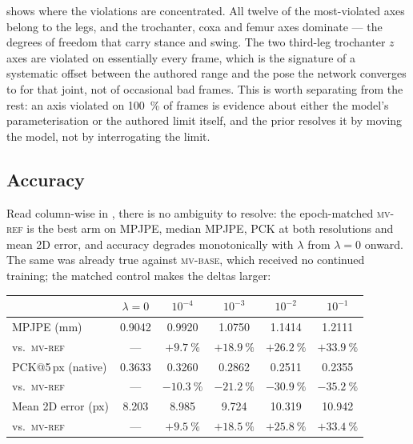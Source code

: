 \documentclass[11pt,a4paper]{article}
\newcommand{\lam}{\lambda}
\newcommand{\armref}{\textsc{mv-ref}}
\newcommand{\armbase}{\textsc{mv-base}}
\begin{document}
 shows where the violations are concentrated. All twelve of the
most-violated axes belong to the legs, and the trochanter, coxa and femur axes
dominate --- the degrees of freedom that carry stance and swing. The two
third-leg trochanter $z$ axes are violated on essentially every frame, which is
the signature of a systematic offset between the authored range and the pose
the network converges to for that joint, not of occasional bad frames. This is
worth separating from the rest: an axis violated on \SI{100}{\percent} of
frames is evidence about either the model's parameterisation or the authored
limit itself, and the prior resolves it by moving the model, not by
interrogating the limit.

\subsection{Accuracy}
\label{sec:res-acc}

Read column-wise in , there is no ambiguity to resolve: the
epoch-matched \armref{} is the best arm on MPJPE, median MPJPE, PCK at both
resolutions and mean 2D error, and accuracy degrades monotonically with $\lam$
from $\lam = 0$ onward. The same was already true against \armbase{}, which
received no continued training; the matched control makes the deltas larger:

\begin{center}
\begin{tabular}{lccccc}
\toprule
 & $\lam=0$ & $10^{-4}$ & $10^{-3}$ & $10^{-2}$ & $10^{-1}$ \\
\midrule
MPJPE (mm)            & 0.9042 & 0.9920 & 1.0750 & 1.1414 & 1.2111 \\
\quad vs.\ \armref{}  & ---    & $+\SI{9.7}{\percent}$ & $+\SI{18.9}{\percent}$ & $+\SI{26.2}{\percent}$ & $+\SI{33.9}{\percent}$ \\
PCK@5\,px (native)    & 0.3633 & 0.3260 & 0.2862 & 0.2511 & 0.2355 \\
\quad vs.\ \armref{}  & ---    & $-\SI{10.3}{\percent}$ & $-\SI{21.2}{\percent}$ & $-\SI{30.9}{\percent}$ & $-\SI{35.2}{\percent}$ \\
Mean 2D error (px)    & 8.203  & 8.985  & 9.724  & 10.319 & 10.942 \\
\quad vs.\ \armref{}  & ---    & $+\SI{9.5}{\percent}$ & $+\SI{18.5}{\percent}$ & $+\SI{25.8}{\percent}$ & $+\SI{33.4}{\percent}$ \\
\bottomrule
\end{tabular}
\end{center}
\end{document}
